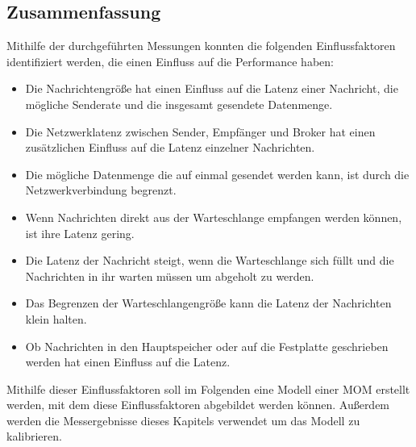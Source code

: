 \subsection{Zusammenfassung}
\label{sec:rmqZusammenfassung}
Mithilfe der durchgeführten Messungen konnten die folgenden Einflussfaktoren identifiziert werden, die einen Einfluss auf die Performance haben:
\begin{itemize}
    \item Die Nachrichtengröße hat einen Einfluss auf die Latenz einer Nachricht, die mögliche Senderate und die insgesamt gesendete Datenmenge.
    \item Die Netzwerklatenz zwischen Sender, Empfänger und Broker hat einen zusätzlichen Einfluss auf die Latenz einzelner Nachrichten.
    \item Die mögliche Datenmenge die auf einmal gesendet werden kann, ist durch die Netzwerkverbindung begrenzt.
    \item Wenn Nachrichten direkt aus der Warteschlange empfangen werden können, ist ihre Latenz gering.
    \item Die Latenz der Nachricht steigt, wenn die Warteschlange sich füllt und die Nachrichten in ihr warten müssen um abgeholt zu werden.
    \item Das Begrenzen der Warteschlangengröße kann die Latenz der Nachrichten klein halten.
    \item Ob Nachrichten in den Hauptspeicher oder auf die Festplatte geschrieben werden hat einen Einfluss auf die Latenz.
\end{itemize}
Mithilfe dieser Einflussfaktoren soll im Folgenden eine Modell einer MOM erstellt werden, mit dem diese Einflussfaktoren abgebildet werden können. Außerdem werden die Messergebnisse dieses Kapitels verwendet um das Modell zu kalibrieren.






